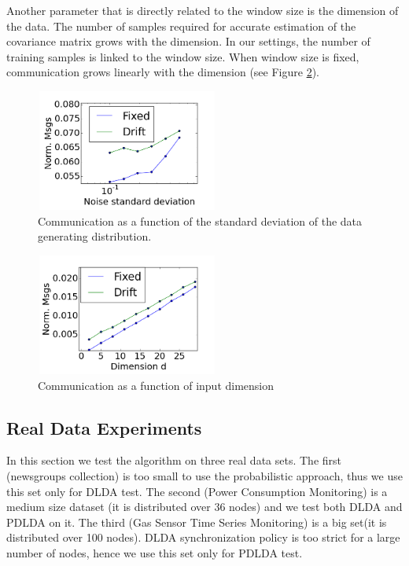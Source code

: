 \documentclass{sig-alternate-05-2015}
\begin{document}
Another parameter that is directly related to the window size is the dimension of the data. The number of samples required for accurate estimation of the covariance matrix grows with the dimension. In our settings, the number of training samples is linked to the window size. When window size is fixed, communication grows linearly with the dimension (see Figure \ref{Dimension}).
	
\begin{figure}
	\centering
	\includegraphics[width=60mm, height=4cm]{CommunicationOfFixedVsDrift/Noise.png}
	\caption{Communication as a function of the standard deviation of the
	data generating distribution.}
	\label{Noise}
	\end{figure}

\begin{figure}
	\centering
	\includegraphics[width=60mm, height=4cm]{CommunicationOfFixedVsDrift/Dimension.png}
	\caption{Communication as a function of input dimension}
	\label{Dimension}
	\end{figure}

\subsection{Real Data Experiments}
In this section we test the algorithm on three real data sets. The first
(newsgroups collection) is too small to use the probabilistic approach, thus we use this set only for DLDA test.
The second (Power Consumption Monitoring) is a medium size dataset (it
is distributed over 36 nodes) and we test both DLDA and PDLDA on it.
The third (Gas Sensor Time Series Monitoring) is a big set(it is distributed over
100 nodes). DLDA synchronization policy is too strict for a large number of nodes, hence we use this set only for PDLDA test.
\end{document}
